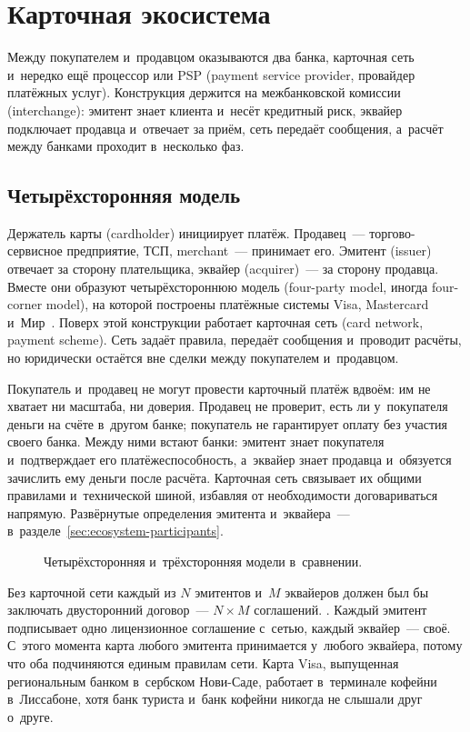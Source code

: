 
\chapter{Карточная экосистема}\label{ch:ecosystem}
Между покупателем и~продавцом оказываются два банка, карточная сеть и~нередко
ещё процессор или PSP (payment service provider, провайдер платёжных услуг).
Конструкция держится на
межбанковской комиссии (interchange): эмитент знает клиента и~несёт кредитный
риск, эквайер подключает продавца и~отвечает за приём, сеть передаёт сообщения,
а~расчёт между банками проходит в~несколько фаз.

\section{Четырёхсторонняя модель}\label{sec:ecosystem-four-party}

Держатель карты (cardholder) инициирует платёж. Продавец~--- торгово-сервисное
предприятие, ТСП, merchant~--- принимает его. Эмитент (issuer) отвечает за
сторону плательщика, эквайер (acquirer)~--- за сторону продавца. Вместе они
образуют четырёхстороннюю модель (four-party model, иногда four-corner model),
на которой построены платёжные системы Visa, Mastercard
и~Мир~\cite{visa-core-rules,mc-rules,cbr-ps}. Поверх этой конструкции работает
карточная сеть (card network, payment scheme). Сеть задаёт правила,
передаёт сообщения и~проводит расчёты, но юридически остаётся вне сделки между
покупателем и~продавцом.

Покупатель и~продавец не могут провести карточный платёж вдвоём: им не хватает
ни масштаба, ни доверия. Продавец не проверит, есть ли у~покупателя деньги на
счёте в~другом банке; покупатель не гарантирует оплату без участия своего
банка. Между ними встают банки: эмитент знает покупателя и~подтверждает его
платёжеспособность, а~эквайер знает продавца и~обязуется зачислить ему деньги
после расчёта. Карточная сеть связывает их общими правилами и~технической
шиной, избавляя от необходимости договариваться напрямую. Развёрнутые
определения эмитента и~эквайера~--- в~разделе~\ref{sec:ecosystem-participants}.

\begin{figure}[tbp]
  \centering
  \caption{Четырёхсторонняя и~трёхсторонняя модели в~сравнении.}%
  \label{fig:party-models}
\end{figure}

Без карточной сети каждый из $N$ эмитентов и~$M$ эквайеров должен был бы
заключать двусторонний договор~--- $N \times M$ соглашений.
. Каждый эмитент
подписывает одно лицензионное соглашение с~сетью, каждый эквайер~--- своё.
С~этого момента карта любого эмитента принимается у~любого эквайера, потому что
оба подчиняются единым правилам сети. Карта Visa, выпущенная региональным
банком в~сербском Нови-Саде, работает в~терминале кофейни в~Лиссабоне, хотя
банк туриста и~банк кофейни никогда не слышали друг о~друге.


